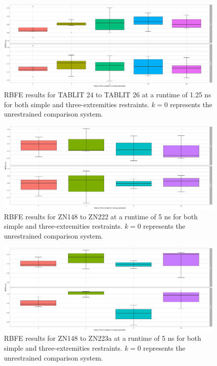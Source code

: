 \documentclass[oneside]{scrreprt}
\begin{document}
\begin{figure}[h]
    \centering
    \includegraphics[width=1\textwidth]{plots/boxplot_rbfe_tablit24to26_1.25ns.png}
    \caption[RBFE results for TABLIT 24 to 26 (1.25ns)]{RBFE results for TABLIT 24 to TABLIT 26 at a runtime of 1.25 ns for both simple and three-extremities restraints. $k=0$ represents the unrestrained comparison system.}
    
\end{figure}



\begin{figure}[h]
    \centering
    \includegraphics[width=1\textwidth]{plots/boxplot_rbfe_zn222_5ns.png}
    \caption[RBFE results for ZN148 to ZN222]{RBFE results for ZN148 to ZN222 at a runtime of 5 ns for both simple and three-extremities restraints. $k=0$ represents the unrestrained comparison system.}
    
\end{figure}

\begin{figure}[h]
    \centering
    \includegraphics[width=1\textwidth]{plots/boxplot_rbfe_zn223a_5ns.png}
    \caption[RBFE results for ZN148 to ZN223a]{RBFE results for ZN148 to ZN223a at a runtime of 5 ns for both simple and three-extremities restraints. $k=0$ represents the unrestrained comparison system.}
    
\end{figure}
\end{document}
